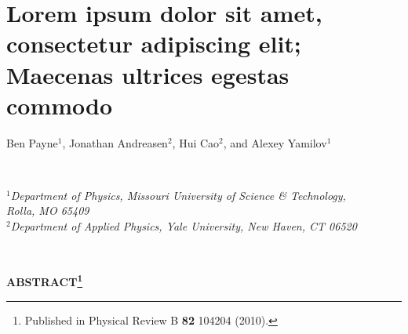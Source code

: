 
%

\chapter{Lorem ipsum dolor sit amet, consectetur adipiscing elit; Maecenas ultrices egestas commodo}
\label{chap:TE_gain}
\label{paper:1_start}

\begin{center}
Ben Payne$^1$, Jonathan Andreasen$^2$, Hui Cao$^2$, and Alexey Yamilov$^1$      \label{sec:TE2009}                                                                         \end{center}

\ \\
\begin{center}
\textit{$^1$Department of Physics, Missouri University of Science \& Technology,\\ Rolla, MO 65409\\
$^2$Department of Applied Physics, Yale University, New Haven, CT 06520}\end{center}

\ \\
\begin{center}\textbf{ABSTRACT\footnote{Published in Physical Review B \textbf{82} 104204 (2010).}}        \end{center}

